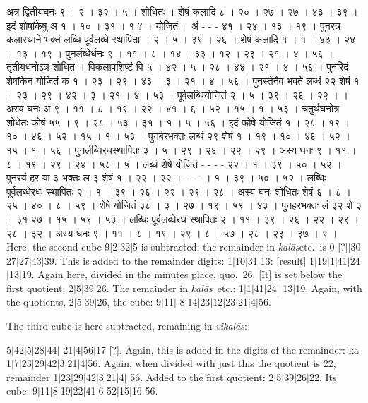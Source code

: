 \documentclass[11pt,a5paper]{book}
\def\kalas{\textit{ka\-l\=as}}
\def\vikalas{\textit{vi\-ka\-l\=as}}
\def\danda{$|$}
\begin{document}
\newpage 
{\s अत्र द्वितीयघनः ९ । २ । ३२ । ५ । शोधितः । शेषं कलादि ८ । २० । २७ । २७ । ४३ । ३९ । 
इदं शोषांकेषु अ १ । १० । ३१ । १ ? । योजितं । अं - - -  ४१ । २४ । १३ । १९ । 
पुनरत्र कलास्थाने भक्तं लब्धि पूर्वलव्धे स्थापिता । २ । ५ । ३९ । २६ ।
शेषं कलादि १ । १ । ४३ । २४ । १३ । १९ । पुनर्लब्धेर्धनः ९ । ११ । ८ । १४ । ३३ । १२ । २३ । २१ । ४ । ५६ । 
तृतीयधनोऽत्र शोधित । विकलावशिष्टं वि ५ । ४२ । ५ । २८ । ४४ । २१ । ४ । ५६ ।
पुनरिदं शेषांकेन योजितं क १ । २३ । २९ । ४३ । ३ । २१ । ४ । ५६ । 
पुनस्तेनैव भक्ते लब्धं २२ शेषं १ । २३ । २९ । ४२ । ३ । २१ । ४ । ५३ । 
पूर्वलब्धियोजितं  २ । ५ । ३९ । २६ । २२ । । 
अस्य घनः अं ९ । ११ । ८ । १९ । २२ । ४१ । ६ । ५२ । १५ । १ । ५३ । 
चतुर्थघनोत्र शोधेतः फोषं ५५ । ९ । २८ । ५३ । ३१ । १ । ५ । ५६ । 
इदं फोषे योजितं १ । २८ । १९ । १० । ४६ । ५२ । १५ । १ । ५३ । 
पुनर्बरभक्तः लब्धं २९ शेषं १ । १९ । १० । ४६ । ५२ । १५ । १ । ५६ । 
पुनर्लब्धिरधस्थापितः ३ । ५ । २९ । २६ । २२ । २९ । 
अस्य घनः ९  । ११ । ८ । १९ । २९ । २४ । ५८ । ५ । 
लब्धं शेषे योजितं - - - - २२ । १ । ३९ । ५० । ५२ । 
पुनरयं हर या ३ भक्तः ल ३ शेषं १ । २२ । २२ । - - - । १ । ३९ । ५० । ५२ । 
लब्धिः पूर्वलब्धेरधः स्थापितः २ । १ । ३९ । २६ । २२ । २९ । २८ । 
अस्य घनः शोधितः शेषं ६ । ८ । २५ । ४० । ८ । ५९ । 
शेषे योजितं ३८ । ३ । २७ । १९ । ५९ । ४३ । 
पुनहरभक्तः लं ३२ शे ३ । ३१  २७ । १५ । ५९ । ५३ । 
लब्धिः पूर्वलब्धेरध स्थापितः २ । ११ । ३९ । २६ । २२ । २९ । २८ । ३२ । 
अस्य घनः ९ । ११ । ८ । १९ । २९ । ८ । ५७ । २८ । २३ । ३७ । ९ । }
\newpage
Here, the second cube 9\danda 2\danda 32\danda 5 is subtracted; the remainder in \kalas etc.\ 
is 0 [?]\danda 30 27\danda 27\danda 43\danda 39. This is added to the remainder digits:
1\danda 10\danda 31\danda 13: [result] 1\danda 19\danda 1\danda 41\danda 24\danda 13\danda 19.
Again here, divided in the minutes place, quo.\ 26. [It] is set below the first quotient: 
2\danda 5\danda 39\danda 26. The remainder in \kalas\ etc.: 1\danda 1\danda 41\danda 24\danda
13\danda 19. Again, with the quotients, 2\danda 5\danda 39\danda 26, the cube: 9\danda 11\danda
8\danda 14\danda 23\danda 12\danda 23\danda 21\danda 4\danda 56.

The third cube is here subtracted, remaining in \vikalas: 

5\danda 42\danda 5\danda 28\danda 44\danda
21\danda 4\danda 56\danda 17 [?]. Again, this is added in the digits of the remainder: ka
1\danda 7\danda 23\danda 29\danda 42\danda 3\danda 21\danda 4\danda 56. Again, when divided with
just this the quotient is 22, remainder 1\danda 23\danda 29\danda 42\danda 3\danda 21\danda 4\danda
56.  Added to the first quotient: 2\danda 5\danda 39\danda 26\danda 22. Its cube:
9\danda 11\danda 8\danda 19\danda 22\danda 41\danda 6 52\danda 15\danda 16 56.
\end{document}
